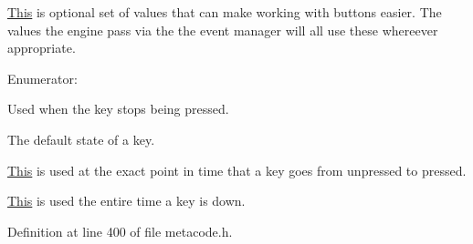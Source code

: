 \hyperlink{structThis}{This} is optional set of values that can make working with buttons easier. The values the engine pass via the the event manager will all use these whereever appropriate. \begin{Desc}
\item[Enumerator: ]\par
\begin{description}
\item[{\em 
\hypertarget{classphys_1_1MetaCode_a2fdfb26b3e50ceb0ccc60bfc4c3d6ac2a6b5564408703517f36debd8c423e2dee}{
BUTTON\_\-LIFTING}
\label{da/dc9/classphys_1_1MetaCode_a2fdfb26b3e50ceb0ccc60bfc4c3d6ac2a6b5564408703517f36debd8c423e2dee}
}]Used when the key stops being pressed. \item[{\em 
\hypertarget{classphys_1_1MetaCode_a2fdfb26b3e50ceb0ccc60bfc4c3d6ac2ae275c52779b0f6ec37533af256a70cc3}{
BUTTON\_\-UP}
\label{da/dc9/classphys_1_1MetaCode_a2fdfb26b3e50ceb0ccc60bfc4c3d6ac2ae275c52779b0f6ec37533af256a70cc3}
}]The default state of a key. \item[{\em 
\hypertarget{classphys_1_1MetaCode_a2fdfb26b3e50ceb0ccc60bfc4c3d6ac2a33669b2b9ca814664296da55702e412d}{
BUTTON\_\-PRESSING}
\label{da/dc9/classphys_1_1MetaCode_a2fdfb26b3e50ceb0ccc60bfc4c3d6ac2a33669b2b9ca814664296da55702e412d}
}]\hyperlink{structThis}{This} is used at the exact point in time that a key goes from unpressed to pressed. \item[{\em 
\hypertarget{classphys_1_1MetaCode_a2fdfb26b3e50ceb0ccc60bfc4c3d6ac2a5b52ee1db94dbc2db23f3b4c267b5438}{
BUTTON\_\-DOWN}
\label{da/dc9/classphys_1_1MetaCode_a2fdfb26b3e50ceb0ccc60bfc4c3d6ac2a5b52ee1db94dbc2db23f3b4c267b5438}
}]\hyperlink{structThis}{This} is used the entire time a key is down. \end{description}
\end{Desc}



Definition at line 400 of file metacode.h.

